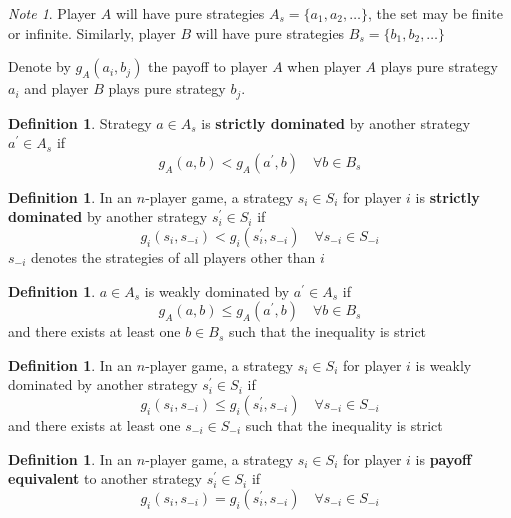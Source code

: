 \documentclass[11pt]{article}
\theoremstyle{plain}
\theoremstyle{definition}
\newtheorem{definition}[theorem]{Definition}
\theoremstyle{remark}
\newtheorem*{note}{Note}
\begin{document}
\begin{note}
    Player \(A\) will have pure strategies \(A_{s} = \{a_1, a_2, \ldots  \}\), the set may be finite or infinite. Similarly, player \(B\) will have pure strategies \(B_{s} = \{b_1, b_2, \ldots  \}\)

    Denote by \(g_{A}(a_{i},b_{j})\) the payoff to player \(A\) when player \(A\) plays pure strategy \(a_{i}\) and player \(B\) plays pure strategy \(b_{j}\).
\end{note}

\setcounter{theorem}{5} 
\begin{definition}
    Strategy \(a \in A_{s}\) is \textbf{strictly dominated} by another strategy \(a^\prime \in A_{s}\) if
    \[
        g_{A}(a,b) < g_{A}(a^\prime,b) \quad \forall b \in B_{s}
    \]
\end{definition}

\begin{definition}
    In an \(n\)-player game, a strategy \(s_{i} \in S_{i}\) for player \(i\) is \textbf{strictly dominated} by another strategy \(s_{i}^\prime \in S_{i}\) if 
    \[
        g_{i}(s_{i},s_{-i}) < g_{i}(s_{i}^\prime,s_{-i}) \quad \forall s_{-i} \in S_{-i}
    \]
    \(s_{-i}\) denotes the strategies of all players other than \(i\)
\end{definition}

\begin{definition}
    \(a \in A_{s}\) is weakly dominated by \(a^\prime \in A_{s}\) if
    \[
        g_{A}(a,b) \leq g_{A}(a^\prime,b) \quad \forall b \in B_{s}
    \]
    and there exists at least one \(b \in B_{s}\) such that the inequality is strict
\end{definition}

\begin{definition}
    In an \(n\)-player game, a strategy \(s_{i} \in S_{i}\) for player \(i\) is weakly dominated by another strategy \(s_{i}^\prime \in S_{i}\) if 
    \[
        g_{i}(s_{i},s_{-i}) \leq g_{i}(s_{i}^\prime,s_{-i}) \quad \forall s_{-i} \in S_{-i}
    \]
    and there exists at least one \(s_{-i} \in S_{-i}\) such that the inequality is strict
\end{definition}

\begin{definition}
    In an \(n\)-player game, a strategy \(s_{i} \in S_{i}\) for player \(i\) is \textbf{payoff equivalent} to another strategy \(s_{i}^\prime \in S_{i}\) if
    \[
        g_{i}(s_{i},s_{-i}) = g_{i}(s_{i}^\prime,s_{-i}) \quad \forall s_{-i} \in S_{-i}
    \]
\end{definition}
\end{document}
